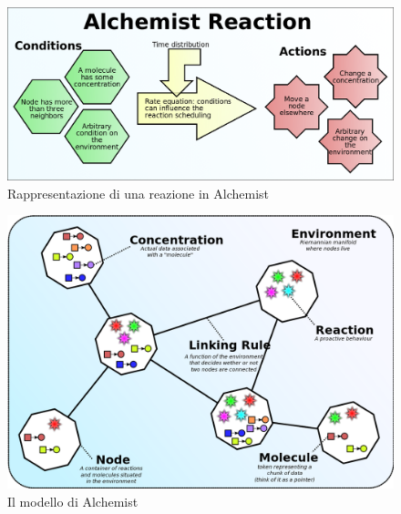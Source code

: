 \begin{figure}[ht]
    \centering
    \includegraphics[width=.6\linewidth]{figures/alchemistReaction.png}
    \caption{Rappresentazione di una reazione in Alchemist}\label{fig:reactionAlchemist}
\end{figure}
\begin{figure}[ht]
    \centering
    \includegraphics[width=.6\linewidth]{figures/alchemistModel.png}
    \caption{Il modello di Alchemist}\label{fig:rmodelAlchemist}
\end{figure}
\clearpage




